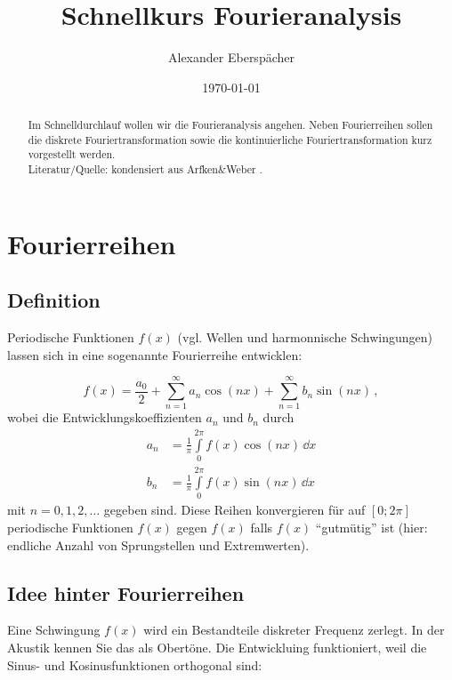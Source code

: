 \documentclass[paper=a4, fontsize=11.0pt, abstractoff, DIV12]{scrartcl}
\title{Schnellkurs Fourieranalysis}
\author{Alexander Eberspächer}
\date{\today}
\begin{document}
\maketitle
\begin{abstract}
Im Schnelldurchlauf wollen wir die Fourieranalysis angehen. Neben Fourierreihen
sollen die diskrete Fouriertransformation sowie die kontinuierliche
Fouriertransformation kurz vorgestellt werden.
\\[0.5ex]
Literatur/Quelle: kondensiert aus Arfken\&Weber \cite{Arfken}.
\end{abstract}

\section{Fourierreihen}

\subsection{Definition}

Periodische Funktionen $f(x)$ (vgl. Wellen und harmonnische Schwingungen)
lassen sich in eine sogenannte Fourierreihe entwicklen:

\begin{equation}
f(x) = \frac{a_0}{2}+\sum\limits_{n=1}^{\infty}a_n\cos(nx) + \sum\limits_{n=1}^{\infty}b_n\sin(nx)\,,
\label{eq:Fourierreihe}
\end{equation}
wobei die Entwicklungskoeffizienten $a_n$ und $b_n$ durch
\begin{align}
a_n &= \frac{1}{\pi}\int\limits_{0}^{2\pi}f(x)\cos(nx)\,\dd x\\
b_n &= \frac{1}{\pi}\int\limits_{0}^{2\pi}f(x)\sin(nx)\,\dd x
\end{align}
mit $n=0,1,2,\dots$ gegeben sind. Diese Reihen konvergieren für auf $[0;2\pi]$
periodische Funktionen $f(x)$ gegen $f(x)$ falls $f(x)$ ``gutmütig'' ist
(hier: endliche Anzahl von Sprungstellen und Extremwerten).

\subsection{Idee hinter Fourierreihen}

Eine Schwingung $f(x)$ wird ein Bestandteile diskreter Frequenz zerlegt. In der
Akustik kennen Sie das als Obertöne. Die Entwickluing funktioniert, weil
die Sinus- und Kosinusfunktionen orthogonal sind:
\end{document}
